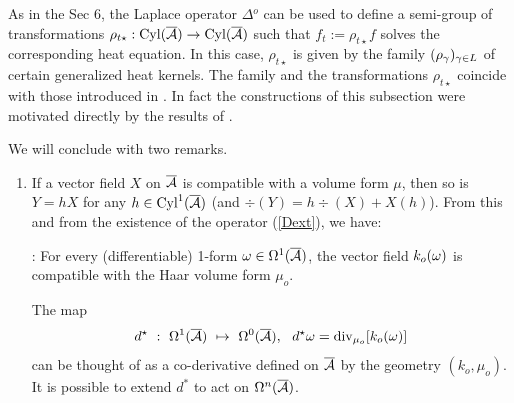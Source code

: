 As in the Sec 6, the Laplace operator $\Delta{\!}^o$ can be used to
define a semi-group of transformations $\rho_{t\star}:{\rm Cyl}(\overline{{\cal A}})
\rightarrow {\rm Cyl}(\overline{{\cal A}}) $ such that $f_t:=\rho_{t\star} f$ solves the 
corresponding heat equation.  In this case, $\rho_{t\star}$ is given
by the family $(\rho_\gamma)_{\gamma\in L}$ of certain generalized heat
kernels. The family and the transformations $\rho_{t\star}$ coincide
with those introduced in \cite{ALMMT3}. In fact the constructions of
this subsection were motivated directly by the results of
\cite{ALMMT3}.
\bigskip

We will conclude with two remarks. 
\begin{enumerate}
\item
If a vector field $X$ on $\overline{{\cal A}}$ is compatible with a volume form $\mu$,
then so is $Y= hX$ for any $h\in{\rm Cyl}^1(\overline{{\cal A}})$ (and $\div(Y)=h\div(X)
+X(h)$). From this and from the existence of the operator
(\ref{Dext}), we have:
\begin{proposition}{\rm :}
For every (differentiable) 1-form $\omega\in\Omega^1(\overline{{\cal A}})$, the vector
field $k_o(\omega)$ is compatible with the Haar volume form $\mu_o$.
\end{proposition}
\noindent The map
%
$$ d^\star\ :\ \Omega^1(\ab)\ \mapsto\ \Omega^0(\ab),\ \ d^\star \o =
\div_{\mu_o} [k_o(\o)] 
$$ 
%
can be thought of as a co-derivative defined on $\overline{{\cal A}}$ by the geometry
$(k_o,\mu_o)$.  It is possible to extend $d^*$ to act on
$\Omega^n(\overline{{\cal A}})$.


\end{enumerate}

